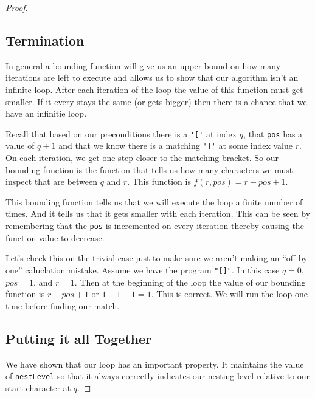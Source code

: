 \documentclass[10pt]{amsart}
\newcommand{\inl}{\lstinline[breaklines=true]}
\begin{document}
\begin{proof}
\begin{center}
\end{center}

\subsection*{Termination}
In general a bounding function will give us an upper bound on how many 
iterations are left to execute and allows us to show that our algorithm isn't
an infinite loop. After each iteration of the loop the value of this 
function must get smaller. If it every stays the same (or gets bigger) then
there is a chance that we have an infinitie loop.

Recall that based on our preconditions there is a \inl!'['! at index $q$,
that \inl!pos! has a value of $q + 1$ and that we know there is a matching
\inl!']'! at some index value $r$. On each iteration, we get one step closer
to the matching bracket. So our bounding function is the function that tells
us how many characters we must inspect that are between $q$ and $r$. 
This function is $f(r, pos) = r - pos + 1$.

This bounding function tells us that we will execute the loop a finite
number of times. And it tells us that it gets smaller with each iteration.
This can be seen by remembering that the \inl!pos! is incremented on
every iteration thereby causing the function value to decrease.

Let's check this on the trivial case just to make sure we aren't making an
``off by one'' caluclation mistake. Assume we have the program
\inl!"[]"!. In this case $q=0$, $pos=1$, and $r=1$. Then at the beginning
of the loop the value of our bounding function is $r - pos + 1$ or
$1 - 1 + 1 = 1$. This is correct. We will run the loop one time before
finding our match.


\subsection*{Putting it all Together}
We have shown that our loop has an important property. It maintains the value
of \inl!nestLevel! so that it always correctly indicates our nesting level
relative to our start character at $q$. 


\end{proof}
\end{document}
